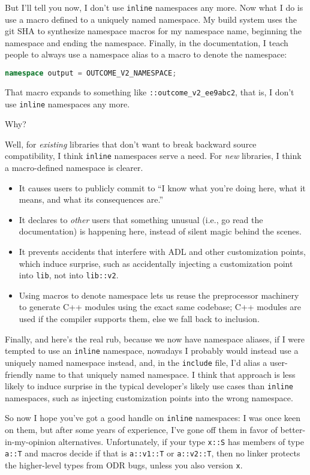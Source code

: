 But I'll tell you now, I don't use \texttt{inline} namespaces any more.
Now what I do is use a macro defined to a uniquely named namespace. My
build system uses the git SHA to synthesize namespace macros for my
namespace name, beginning the namespace and ending the namespace.
Finally, in the documentation, I teach people to always use a namespace
alias to a macro to denote the namespace:

\begin{lstlisting}[language=C++]
namespace output = OUTCOME_V2_NAMESPACE;
\end{lstlisting}

\noindent That macro expands to something like \texttt{::outcome\_v2\_ee9abc2},
that is, I don't use \texttt{inline} namespaces any more.

Why?

Well, for \emph{existing} libraries that don't want to break backward
source compatibility, I think \texttt{inline} namespaces serve a need.
For \emph{new} libraries, I think a macro-defined namespace is clearer.
\begin{itemize}
\item{It causes users to publicly commit to ``I know what you’re doing here, what it means, and what its consequences are.''}
\item{It declares to \emph{other} users that something unusual (i.e., go read the documentation) is happening here, instead of silent magic behind the scenes.}
\item{It prevents accidents that interfere with ADL and other customization points, which induce surprise, such as accidentally injecting a customization point into \texttt{lib}, not into \texttt{lib::v2}.}
\item{Using macros to denote namespace lets us reuse the preprocessor machinery to generate C++ modules using the exact same codebase; C++ modules are used if the compiler supports them, else we fall back to inclusion.}
\end{itemize}

Finally, and here's the real rub, because we now have namespace aliases,
if I were tempted to use an \texttt{inline} namespace, nowadays I probably would
instead use a uniquely named namespace instead, and, in the \texttt{include} file,
I'd alias a user-friendly name to that uniquely named namespace. I think
that approach is less likely to induce surprise in the typical
developer's likely use cases than \texttt{inline} namespaces, such as
injecting customization points into the wrong namespace.

So now I hope you've got a good handle on \texttt{inline} namespaces: I
was once keen on them, but after some years of experience, I've gone off
them in favor of better-in-my-opinion alternatives. Unfortunately, if your type \texttt{x::S} has members of type
\texttt{a::T} and macros decide if that is \texttt{a::v1::T} or
\texttt{a::v2::T}, then no linker protects the higher-level types from
ODR bugs, unless you also version \texttt{x}.


